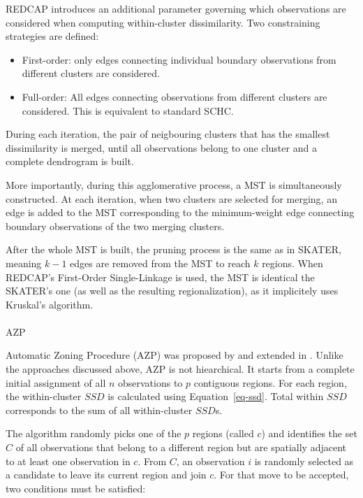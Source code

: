 \documentclass[
  english,
  12pt,
  a4paper,
]{article}
\makeatletter
\let\oldparagraph\paragraph
\renewcommand{\paragraph}{
    \@ifstar
      \xxxParagraphStar
      \xxxParagraphNoStar
  }
\newcommand{\xxxParagraphStar}[1]{\oldparagraph*{#1}\mbox{}}
\newcommand{\xxxParagraphNoStar}[1]{\oldparagraph{#1}\mbox{}}
\providecommand{\tightlist}{%
  \setlength{\itemsep}{0pt}\setlength{\parskip}{0pt}}
\makeatother
\begin{document}
REDCAP introduces an additional parameter governing which observations
are considered when computing within-cluster dissimilarity. Two
constraining strategies are defined:

\begin{itemize}
\tightlist
\item
  First-order: only edges connecting individual boundary observations
  from different clusters are considered.
\item
  Full-order: All edges connecting observations from different clusters
  are considered. This is equivalent to standard SCHC.
\end{itemize}

During each iteration, the pair of neigbouring clusters that has the
smallest dissimilarity is merged, until all observations belong to one
cluster and a complete dendrogram is built.

More importantly, during this agglomerative process, a MST is
simultaneously constructed. At each iteration, when two clusters are
selected for merging, an edge is added to the MST corresponding to the
minimum-weight edge connecting boundary observations of the two merging
clusters.

After the whole MST is built, the pruning process is the same as in
SKATER, meaning \(k-1\) edges are removed from the MST to reach \(k\)
regions. When REDCAP's First-Order Single-Linkage is used, the MST is
identical the SKATER's one (as well as the resulting regionalization),
as it implicitely uses Kruskal's algorithm.

\paragraph{AZP}\label{azp}

Automatic Zoning Procedure (AZP) was proposed by \citet{openshaw1977}
and extended in \citet{openshaw1995}. Unlike the approaches discussed
above, AZP is not hiearchical. It starts from a complete initial
assignment of all \(n\) observations to \(p\) contiguous regions. For
each region, the within-cluster \(SSD\) is calculated using
Equation~\ref{eq-ssd}. Total within \(SSD\) corresponds to the sum of
all within-cluster \(SSD\)s.

The algorithm randomly picks one of the \(p\) regions (called \(c\)) and
identifies the set \(C\) of all observations that belong to a different
region but are spatially adjacent to at least one observation in \(c\).
From \(C\), an observation \(i\) is randomly selected as a candidate to
leave its current region and join \(c\). For that move to be accepted,
two conditions must be satisfied:
\end{document}
